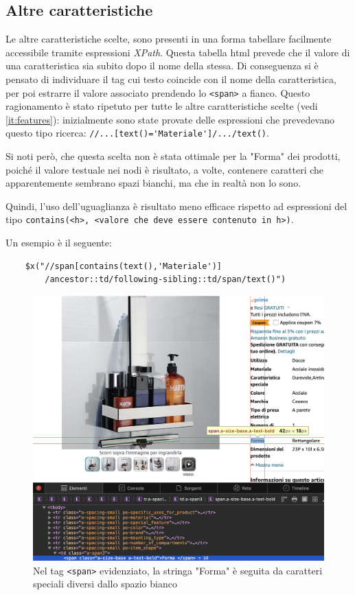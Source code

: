 \subsection{Altre caratteristiche}
Le altre caratteristiche scelte, sono presenti in una forma tabellare facilmente accessibile tramite espressioni \textit{XPath}. Questa tabella html prevede che il valore di una caratteristica sia subito dopo il nome della stessa. Di conseguenza si è pensato di individuare il tag cui testo coincide con il nome della caratteristica, per poi estrarre il valore associato prendendo lo \texttt{<span>} a fianco. Questo ragionamento è stato ripetuto per tutte le altre caratteristiche scelte (vedi \ref{it:features}): inizialmente sono state provate delle espressioni che prevedevano questo tipo ricerca: \verb|//...[text()='Materiale']/.../text()|.

Si noti però, che questa scelta non è stata ottimale per la "Forma" dei prodotti, poiché 
il valore testuale nei nodi è risultato, a volte, contenere caratteri che apparentemente sembrano spazi bianchi, ma che in realtà non lo sono. 

Quindi, l'uso dell'uguaglianza è risultato meno efficace rispetto ad espressioni del tipo \verb|contains(<h>, <valore che deve essere contenuto in h>)|. 

Un esempio è il seguente:
\begin{verbatim}
    $x("//span[contains(text(),'Materiale')]
        /ancestor::td/following-sibling::td/span/text()")
\end{verbatim}

\begin{figure}[h]
    \centering
    \includegraphics[width=\textwidth]{img/forma_problem.png}
    \caption{Nel tag \texttt{<span>} evidenziato, la stringa "Forma" è seguita da caratteri speciali diversi dallo spazio bianco}
    \label{fig:my_label}
\end{figure}

